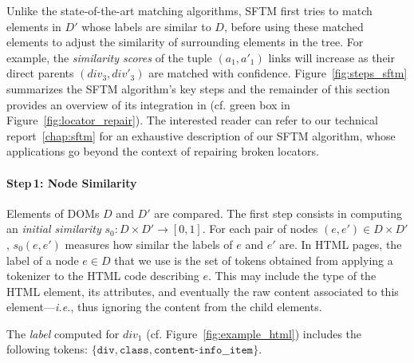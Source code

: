 Unlike the state-of-the-art matching algorithms, SFTM first tries to match elements in $D'$ whose labels are similar to $D$, before using these matched elements to adjust the similarity of surrounding elements in the tree.
For example, the \emph{similarity scores} of the tuple $(a_1,a'_1)$ links will increase as their direct parents $(div_3,div'_3)$ are matched with confidence.
% 
Figure~\ref{fig:steps_sftm} summarizes the SFTM algorithm's key steps and the remainder of this section provides an overview of its integration in \erratum{} (cf. green box in Figure~\ref{fig:locator_repair}).
The interested reader can refer to our technical report~\ref{chap:sftm} for an exhaustive description of our SFTM algorithm, whose applications go beyond the context of repairing broken locators.

\paragraph{Step\,1: Node Similarity}\label{sec:node_similarity}
Elements of DOMs $D$ and $D'$ are compared. 
The first step consists in computing an \emph{initial similarity} $s_0 : D \times D' \to [0, 1]$.
For each pair of nodes $(e, e') \in D \times D'$, $s_0(e,e')$ measures how similar the labels of $e$ and $e'$ are.
In HTML pages, the label of a node $e \in D$ that we use is the set of tokens obtained from applying a tokenizer to the HTML code describing $e$. 
This may include the type of the HTML element, its attributes, and eventually the raw content associated to this element---\emph{i.e.}, thus ignoring the content from the child elements.
\begin{ex}
The \emph{label} computed for $div_1$ (cf. Figure~\ref{fig:example_html}) includes the following tokens: $\{\texttt{div}, \texttt{class}, \texttt{content-info\_\_item} \}$. %
\end{ex}

